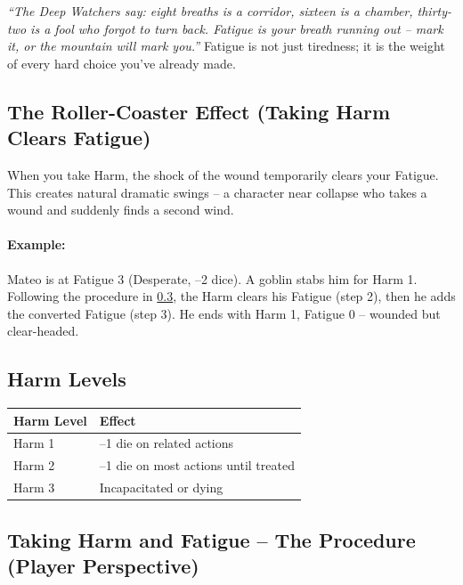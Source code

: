 \begin{tcolorbox}[colback=brown!5!white,colframe=brown!70!black,title=\textit{Aeler Breath-Counting},breakable]
\emph{``The Deep Watchers say: eight breaths is a corridor, sixteen is a chamber, thirty-two is a fool who forgot to turn back. Fatigue is your breath running out -- mark it, or the mountain will mark you.''}  
Fatigue is not just tiredness; it is the weight of every hard choice you've already made.
\end{tcolorbox}

\subsection{The Roller-Coaster Effect (Taking Harm Clears Fatigue)}
\label{sec:roller-coaster}
When you take Harm, the shock of the wound temporarily clears your Fatigue. This creates natural dramatic swings -- a character near collapse who takes a wound and suddenly finds a second wind.

\paragraph{Example:} Mateo is at Fatigue 3 (Desperate, --2 dice). A goblin stabs him for Harm 1. Following the procedure in \ref{sec:take-harm-fatigue}, the Harm clears his Fatigue (step 2), then he adds the converted Fatigue (step 3). He ends with Harm 1, Fatigue 0 -- wounded but clear-headed.

\subsection{Harm Levels}
\label{sec:harm}
\begin{center}
\begin{tabular}{ll}
\toprule
\textbf{Harm Level} & \textbf{Effect} \\
\midrule
Harm 1 & --1 die on related actions \\
Harm 2 & --1 die on most actions until treated \\
Harm 3 & Incapacitated or dying \\
\bottomrule
\end{tabular}
\end{center}
\subsection{Taking Harm and Fatigue -- The Procedure (Player Perspective)}
\label{sec:take-harm-fatigue}

